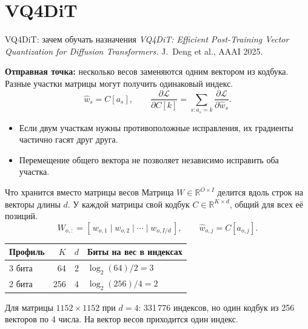 \documentclass[aspectratio=169,10pt]{beamer}
\newcommand{\takeaway}[1]{\par\vspace{1.5mm}{\bfseries #1\par}}
\newcommand{\smalltext}[1]{{\fontsize{10}{12}\selectfont #1\par}}
\newcommand{\tights}{\setlength{\itemsep}{1.4mm}\setlength{\parsep}{0pt}\setlength{\parskip}{0pt}}
\newenvironment{datatable}{\par\begingroup\fontsize{10}{12}\selectfont\setlength{\tabcolsep}{4pt}\renewcommand{\arraystretch}{1.25}}{\par\endgroup}
\begin{document}
\section{VQ4DiT}

\begin{frame}[t]{VQ4DiT: зачем обучать назначения}
  \textit{VQ4DiT: Efficient Post-Training Vector Quantization for Diffusion Transformers.}
  J.~Deng et al., AAAI 2025.

  \textbf{Отправная точка:} несколько весов заменяются одним вектором из кодбука.
  Разные участки матрицы могут получить одинаковый индекс.
  \[
    \widehat w_s=C[a_s],\qquad
    \frac{\partial\mathcal L}{\partial C[k]}
      =\sum_{s:a_s=k}\frac{\partial\mathcal L}{\partial\widehat w_s}.
  \]
  \begin{itemize}\tights
    \item Если двум участкам нужны противоположные исправления, их градиенты частично гасят друг друга.
    \item Перемещение общего вектора не позволяет независимо исправить оба участка.
  \end{itemize}
  \takeaway{Идея VQ4DiT: обучать не только значения в кодбуке,\par
  но и выбор вектора для каждого участка весов.}
\end{frame}

\begin{frame}[t]{Что хранится вместо матрицы весов}
  Матрица $W\in\mathbb R^{O\times I}$ делится вдоль строк на векторы длины $d$.
  У каждой матрицы свой кодбук $C\in\mathbb R^{K\times d}$, общий для всех её позиций.
  \[
    W_{o,:}=[\,w_{o,1}\mid w_{o,2}\mid\cdots\mid w_{o,I/d}\,],
    \qquad \widehat w_{o,j}=C[a_{o,j}].
  \]
  \begin{datatable}
    \begin{tabular*}{\textwidth}{@{\extracolsep{\fill}}lrrl@{}}
      \toprule
      Профиль & $K$ & $d$ & Биты на вес в индексах \\
      \midrule
      3 бита & 64 & 2 & $\log_2(64)/2=3$ \\
      2 бита & 256 & 4 & $\log_2(256)/4=2$ \\
      \bottomrule
    \end{tabular*}
  \end{datatable}
  \smalltext{Для матрицы $1152\times1152$ при $d=4$: 331\,776 индексов,
  но один кодбук из 256 векторов по 4 числа. На вектор весов приходится один индекс.}
  \takeaway{VQ4DiT: 5 матриц в блоке $\times$ 28 блоков = 140 кодбуков.\par
  Кодбуки не общие между матрицами; по времени $t$ они не меняются.}
\end{frame}
\end{document}
